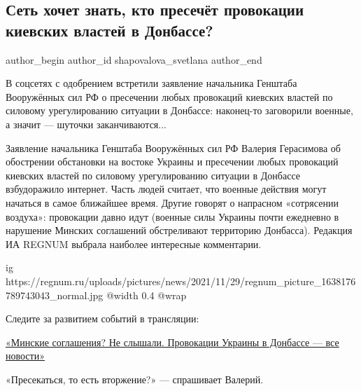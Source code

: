  
 
 
 

\subsection{Сеть хочет знать, кто пресечёт провокации киевских властей в Донбассе?}
\label{sec:09_12_2021.stz.news.ru.regnum.1.kiev_vlast_donbass}

\ifcmt
 author_begin
   author_id shapovalova_svetlana
 author_end
\fi

\begin{zznagolos}
В соцсетях с одобрением встретили заявление начальника Генштаба Вооружённых сил
РФ о пресечении любых провокаций киевских властей по силовому урегулированию
ситуации в Донбассе: наконец-то заговорили военные, а значит — шуточки
заканчиваются...
\end{zznagolos}

Заявление начальника Генштаба Вооружённых сил РФ Валерия Герасимова об
обострении обстановки на востоке Украины и пресечении любых провокаций киевских
властей по силовому урегулированию ситуации в Донбассе взбудоражило интернет.
Часть людей считает, что военные действия могут начаться в самое ближайшее
время. Другие говорят о напрасном «сотрясении воздуха»: провокации давно идут
(военные силы Украины почти ежедневно в нарушение Минских соглашений
обстреливают территорию Донбасса). Редакция ИА REGNUM выбрала наиболее
интересные комментарии.

\ifcmt
  ig https://regnum.ru/uploads/pictures/news/2021/11/29/regnum_picture_1638176789743043_normal.jpg
  @width 0.4
  @wrap 
\fi

Следите за развитием событий в трансляции: 

\href{https://regnum.ru/news/polit/3428732.html}{%
«Минские соглашения? Не слышали. Провокации Украины в Донбассе — все новости»}

«Пресекаться, то есть вторжение?» — спрашивает Валерий.

